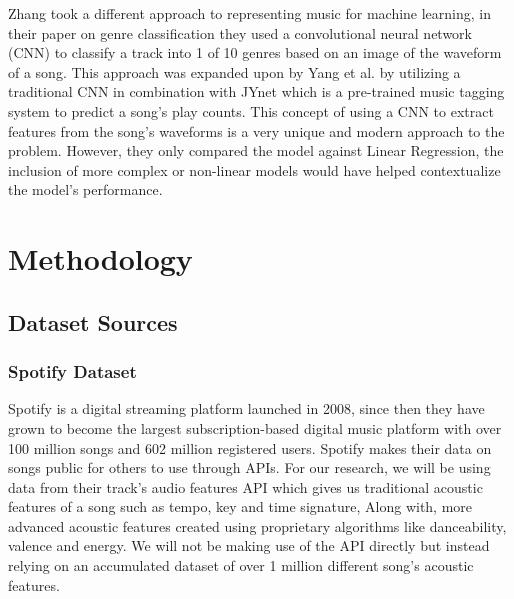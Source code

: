 \documentclass[conference]{IEEEtran}
\begin{document}
Zhang\cite{b15} took a different approach to representing music for machine learning, in their paper on genre classification they used a convolutional neural network (CNN) to classify a track into 1 of 10 genres based on an image of the waveform of a song. This approach was expanded upon by Yang et al.\cite{b16} by utilizing a traditional CNN in combination with JYnet which is a pre-trained music tagging system to predict a song's play counts. This concept of using a CNN to extract features from the song's waveforms is a very unique and modern approach to the problem. However, they only compared the model against Linear Regression, the inclusion of more complex or non-linear models would have helped contextualize the model's performance.

\section{Methodology}

\subsection{Dataset Sources}
\subsubsection{Spotify Dataset}
Spotify is a digital streaming platform launched in 2008, since then they have grown to become the largest subscription-based digital music platform with over 100 million songs and 602 million registered users\cite{b17}. Spotify makes their data on songs public for others to use through APIs. For our research, we will be using data from their track's audio features API\cite{b20} which gives us traditional acoustic features of a song such as tempo, key and time signature, Along with, more advanced acoustic features created using proprietary algorithms like danceability, valence and energy. We will not be making use of the API directly but instead relying on an accumulated dataset of over 1 million different song's acoustic features\cite{b18}.
\end{document}
